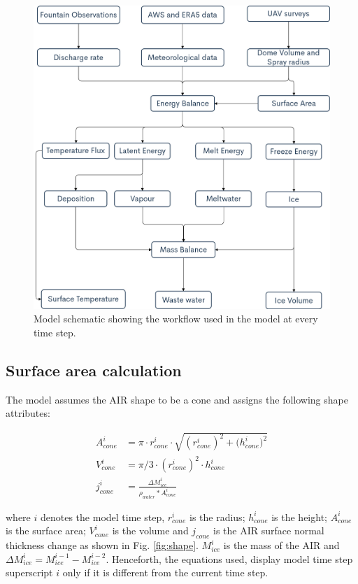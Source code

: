\documentclass[utf8]{frontiersSCNS}
\begin{document}
\begin{figure}
	\begin{center}
		\includegraphics[width=10 cm]{Figures/Figure_3.jpg}
	\end{center}
	\caption{Model schematic showing the workflow used in the model at every time step. }
	\label{fig:schema}
\end{figure}

\subsection{Surface area calculation} \label{sec:shape}

The model assumes the AIR shape to be a cone and assigns the following shape attributes:

\begin{subequations}

	\begin{align}
		\label{eq:A}
		A_{cone}^i & = \pi \cdot r_{cone}^i \cdot \sqrt{{(r_{cone}^i)}^2 + {(h_{cone}^i})^ 2} \\
		\label{eq:V}
		V_{cone}^i & = \pi/3 \cdot {(r_{cone}^i)}^2 \cdot h_{cone}^i                                         \\
		\label{eq:thickness}
		j_{cone}^i & =\frac{\Delta M_{ice}^i}{\rho_{water}* A_{cone}^i}
	\end{align}
\end{subequations}

where $i$ denotes the model time step, $r_{cone}^i$ is the radius; $h_{cone}^i$ is the height; $A_{cone}^i$ is
the surface area; $V_{cone}^i$ is the volume and $j_{cone}$ is the AIR surface normal thickness change as shown
in Fig. \ref{fig:shape}. $M_{ice}^i$ is the mass of the AIR and $\Delta M_{ice}^i = M_{ice}^{i-1} -
M_{ice}^{i-2}$. Henceforth, the equations used, display model time step superscript $i$ only if it is different
from the current time step.
\end{document}
